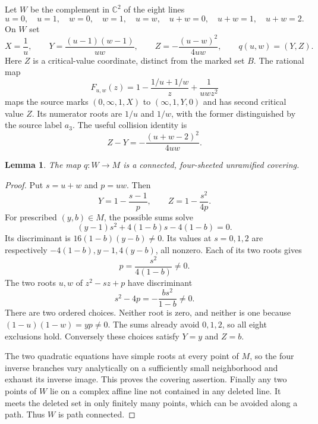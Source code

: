 \documentclass[11pt]{article}
\newcommand{\C}{\mathbb C}
\newtheorem{lemma}[theorem]{Lemma}
\theoremstyle{remark}
\begin{document}
Let $W$ be the complement in $\C^2$ of the eight lines
\begin{equation}\label{eq:lines}
 u=0,\quad u=1,\quad w=0,\quad w=1,\quad
 u=w,\quad u+w=0,\quad u+w=1,\quad u+w=2.
\end{equation}
On $W$ set
\begin{equation}\label{eq:XYB}
 X=\frac1u,\qquad Y=\frac{(u-1)(w-1)}{uw},\qquad
 Z=-\frac{(u-w)^2}{4uw},\qquad q(u,w)=(Y,Z).
\end{equation}
Here $Z$ is a critical-value coordinate, distinct from the marked set $B$. The rational map
\begin{equation}\label{eq:Fuw}
 F_{u,w}(z)=1-\frac{1/u+1/w}{z}+\frac1{uwz^2}
\end{equation}
maps the source marks $(0,\infty,1,X)$ to $(\infty,1,Y,0)$ and has second critical value $Z$. Its numerator roots are $1/u$ and $1/w$, with the former distinguished by the source label $a_3$. The useful collision identity is
\begin{equation}\label{eq:collision}
 Z-Y=-\frac{(u+w-2)^2}{4uw}.
\end{equation}

\begin{lemma}\label{lem:q}
The map $q:W\to M$ is a connected, four-sheeted unramified covering.
\end{lemma}
\begin{proof}
Put $s=u+w$ and $p=uw$. Then
\[
 Y=1-\frac{s-1}{p},\qquad Z=1-\frac{s^2}{4p}.
\]
For prescribed $(y,b)\in M$, the possible sums solve
\begin{equation}\label{eq:inverse}
 (y-1)s^2+4(1-b)s-4(1-b)=0.
\end{equation}
Its discriminant is $16(1-b)(y-b)\ne0$. Its values at $s=0,1,2$ are respectively $-4(1-b),y-1,4(y-b)$, all nonzero. Each of its two roots gives
\[
 p=\frac{s^2}{4(1-b)}\ne0.
\]
The two roots $u,w$ of $z^2-sz+p$ have discriminant
\[
 s^2-4p=-\frac{bs^2}{1-b}\ne0.
\]
There are two ordered choices. Neither root is zero, and neither is one because $(1-u)(1-w)=yp\ne0$. The sums already avoid $0,1,2$, so all eight exclusions hold. Conversely these choices satisfy $Y=y$ and $Z=b$.

The two quadratic equations have simple roots at every point of $M$, so the four inverse branches vary analytically on a sufficiently small neighborhood and exhaust its inverse image. This proves the covering assertion. Finally any two points of $W$ lie on a complex affine line not contained in any deleted line. It meets the deleted set in only finitely many points, which can be avoided along a path. Thus $W$ is path connected.
\end{proof}
\end{document}
